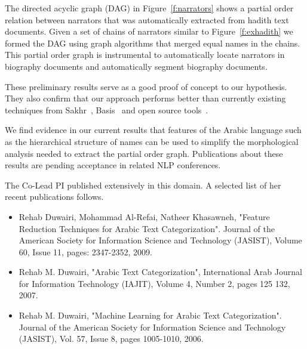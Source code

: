 \documentclass[12pt]{article}
\begin{document}
\begin{figure}[tb]
\end{figure}

The directed acyclic graph (DAG) 
in Figure~\ref{f:narrators} shows a partial order relation between
narrators that was automatically extracted from hadith text 
documents.
Given a set of chains of narrators similar to 
Figure~\ref{f:exhadith} we formed the DAG using graph algorithms 
that merged equal names in the chains. 
This partial order graph is instrumental to automatically
locate narrators in biography documents and automatically
segment biography documents.

These preliminary results serve as a good proof of concept to our 
hypothesis. They also confirm that our approach performs better than 
currently existing techniques from Sakhr~\cite{Sak09},
Basis~\cite{Bas09} and open source 
tools~\cite{Col09,Otakar:07,Tim04}.

We find evidence in our current results that features 
of the Arabic language such as the hierarchical structure of
names can be used to simplify the morphological analysis
needed to extract the partial order graph. 
Publications about these results are pending acceptance in 
related NLP conferences. 

The Co-Lead PI published extensively in this domain. 
A selected list of her recent publications follows. 
\begin{itemize}\itemsep0pt
\item Rehab Duwairi, Mohammad Al-Refai, Natheer Khasawneh, 
"Feature Reduction Techniques for Arabic Text Categorization". 
Journal of the American Society for Information Science and Technology 
(JASIST), Volume 60, Issue 11, pages: 2347-2352, 2009. 
\item Rehab M. Duwairi, "Arabic Text Categorization", 
International Arab Journal for Information Technology (IAJIT), 
Volume 4, Number 2, pages 125  132, 2007.
\item Rehab M. Duwairi, "Machine Learning for Arabic Text Categorization". 
Journal of the American Society for Information Science and Technology 
(JASIST), Vol. 57, Issue 8, pages 1005-1010, 2006.
\end{itemize}
\end{document}

